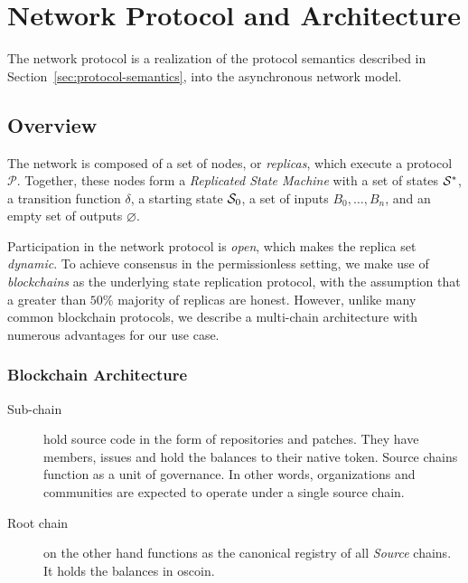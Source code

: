 \section{Network Protocol and Architecture}

The \oscoin{} network protocol is a realization of the protocol semantics
described in Section~\ref{sec:protocol-semantics}, into the asynchronous network
model.

\subsection{Overview}


The \oscoin{} network is composed of a set of nodes, or \emph{replicas}, which
execute a protocol $\mathcal{P}$. Together, these nodes form a \emph{Replicated
State Machine} with a set of states $\mathcal{S}^*$, a transition function $\delta$,
a starting state $\mathcal{S}_0$, a set of inputs $B_0,\dots,B_n$, and an empty set
of outputs $\varnothing$.

Participation in the network protocol is \emph{open}, which makes the replica
set \emph{dynamic}. To achieve consensus in the permissionless setting, we make
use of \emph{blockchains} as the underlying state replication protocol, with
the assumption that a greater than $50\%$ majority of replicas are honest.
However, unlike many common blockchain protocols, we describe a multi-chain
architecture with numerous advantages for our use case.

\subsubsection{Blockchain Architecture}


\begin{description}
    \item[Sub-chain] hold source code in the form of repositories and
        patches.  They have members, issues and hold the balances to their
        native token.  Source chains function as a unit of governance.  In
        other words, organizations and communities are expected to operate
        under a single source chain.
    \item[Root chain] on the other hand functions as the canonical registry
        of all \emph{Source} chains. It holds the balances in oscoin.
\end{description}

